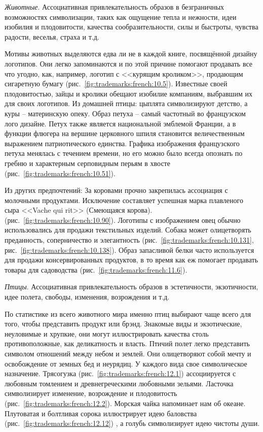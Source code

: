 \emph{Животные}. Ассоциативная привлекательность образов в безграничных
  возможностях символизации, таких как ощущение тепла и нежности, идеи изобилия и
  плодовитости, качества сообразительности, силы и быстроты, чувства радости,
  веселья, страха и т.д.

  Мотивы животных выделяются едва ли не в каждой книге, посвящённой дизайну
  логотипов. Они легко запоминаются и по этой причине помогают продавать все что
  угодно, как, например, логотип с <<курящим кроликом>>, продающим сигаретную бумагу
  (рис.~\ref{fig:trademarks:french:10.5}). Известные своей плодовитостью, зайцы и
  кролики обещают изобилие компаниям, выбравшим их для своих логотипов.  Из
  домашней птицы: цыплята символизируют детство, а куры -- материнскую опеку.
  Образ петуха -- самый частотный во французском лого дизайне. Петух также
  является национальной эмблемой Франции, а в функции флюгера на вершине
  церковного шпиля становится величественным выражением патриотического
  единства. Графика изображения французского петуха менялась с течением времени,
  но его можно было всегда опознать по гребню и характерным серповидным перьям в
  хвосте (рис.~\ref{fig:trademarks:french:10.51}).

  Из других предпочтений: За коровами прочно закрепилась ассоциация с молочными
  продуктами. Исключение составляет успешная марка плавленого сыра <<Vache qui
  rit>> (Смеющаяся корова). (рис.~\ref{fig:trademarks:french:10.90}). Логотипы с
  изображением овец обычно использовались для продажи текстильных изделий. Собака
  может олицетворять преданность, соперничество и элегантность
  (рис.~\ref{fig:trademarks:french:10.131},
  рис.~\ref{fig:trademarks:french:10.138}).  Образ запасливой белки часто
  используется для продажи консервированных продуктов, в то время как еж помогает
  продавать товары для садоводства (рис.~\ref{fig:trademarks:french:11.6}).

\emph{Птицы}. Ассоциативная привлекательность образов в эстетичности,
  экзотичности, идее полета, свободы, изменения, возрождения и т.д.

  По статистике из всего животного мира именно птиц выбирают чаще всего для
  того, чтобы представить продукт или брэнд. Знакомые виды и экзотические,
  неуловимые и хрупкие, они могут иллюстрировать качества столь противоположные,
  как деликатность и власть. Птичий полет легко представить символом отношений
  между небом и землей. Они олицетворяют собой мечту и освобождение от земных бед
  и неурядиц. У каждого вида свое символическое назначение.  Трясогузка
  (рис.~\ref{fig:trademarks:french:12.1}) ассоциируется с любовным томлением и
  древнегреческими любовными зельями. Ласточка символизирует изменение,
  возрождение и плодовитость (рис.~\ref{fig:trademarks:french:12.2}). Морская
  чайка напоминает нам об океане. Плутоватая и болтливая сорока иллюстрирует идею
  баловства (рис.~\ref{fig:trademarks:french:12.12}) , а голубь символизирует идею
  чистоты души.

